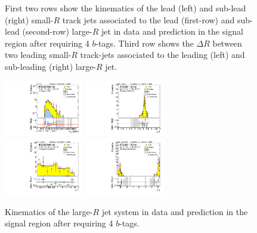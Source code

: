 \begin{figure}[htbp!]
\begin{center}
  \caption{First two rows show the kinematics of the lead (left) and sub-lead (right) small-$R$ track jets associated to the lead (first-row) and sub-lead (second-row) large-$R$ jet in data and prediction in the signal region after requiring 4 $b$-tags. Third row shows the $\Delta R$ between two leading small-$R$ track-jets associated to the leading (left) and sub-leading (right) large-$R$ jet.  }
  \label{fig:boosted-4b-signal-ak2}
\end{center}
\end{figure}


\begin{figure}[htbp!]
\begin{center}
\includegraphics[width=0.31\textwidth,angle=-90]{figures/boosted/Signal/b77_FourTag_Signal_mHH_l_1.pdf}
\includegraphics[width=0.31\textwidth,angle=-90]{figures/boosted/Signal/b77_FourTag_Signal_hCandDr.pdf}\\
\includegraphics[width=0.31\textwidth,angle=-90]{figures/boosted/Signal/b77_FourTag_Signal_hCandDeta.pdf}
\includegraphics[width=0.31\textwidth,angle=-90]{figures/boosted/Signal/b77_FourTag_Signal_hCandDphi.pdf}
  \caption{Kinematics of the large-$R$ jet system in data and prediction in the signal region after requiring 4 $b$-tags.  }
  \label{fig:boosted-4b-signal-ak10-system}
\end{center}
\end{figure}


